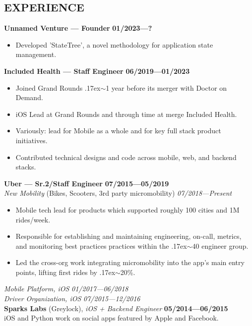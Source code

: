 \documentclass[line,margin]{res}
\newcommand{\goodtilde}{\raise.17ex\hbox{$\scriptstyle\mathtt{\sim}$}}
\begin{document}
\begin{resume}
\section{EXPERIENCE}
    \textbf{Unnamed Venture — Founder} \hfill \textbf{01/2023—?}
    \begin{itemize}  \itemsep -1pt
        \item Developed 'StateTree', a novel methodology for application state management.
    \end{itemize}
    \textbf{Included Health — Staff Engineer} \hfill \textbf{06/2019—01/2023}
    \begin{itemize}  \itemsep -1pt
        \item Joined Grand Rounds \goodtilde1 year before its merger with Doctor on Demand.
        \item iOS Lead at Grand Rounds and through time at merge Included Health.
        \item Variously: lead for Mobile as a whole and for key full stack product initiatives.
        \item Contributed technical designs and code across mobile, web, and backend stacks.
    \end{itemize}
    \textbf{Uber — Sr.2/Staff Engineer} \hfill \textbf{07/2015—05/2019}\\
    {\sl New Mobility} (Bikes, Scooters, 3rd party micromobility) \hfill {\sl07/2018—Present}
    \begin{itemize}  \itemsep -1pt
        \item Mobile tech lead for products which supported roughly 100 cities and 1M rides/week.
        \item Responsible for establishing and maintaining engineering, on-call, metrics, and monitoring best practices practices within the \goodtilde40 engineer group.
        \item Led the cross-org work integrating micromobility into the app's main entry points, lifting first rides by \goodtilde20\%.
    \end{itemize}
    {\sl Mobile Platform, iOS} \hfill {\sl01/2017—06/2018} \\
    {\sl Driver Organization, iOS} \hfill {\sl07/2015—12/2016} \\

    \textbf{Sparks Labs} (Greylock), {\sl iOS + Backend Engineer} \hfill \textbf{05/2014—06/2015} \\
    iOS and Python work on social apps featured by Apple and Facebook.


\end{resume}
\end{document}
